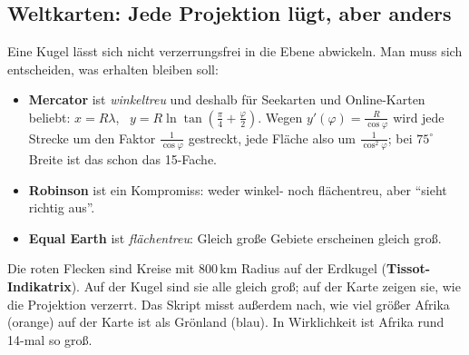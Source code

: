 \begin{ausgabe}

\centering
\begin{passend}%
%
\end{passend}
\end{ausgabe}



\subsection{Weltkarten: Jede Projektion lügt, aber anders}

Eine Kugel lässt sich nicht verzerrungsfrei in die Ebene abwickeln. Man muss sich entscheiden, was erhalten bleiben soll:

\begin{itemize}
	\item \textbf{Mercator} ist \textit{winkeltreu} und deshalb für Seekarten und Online-Karten beliebt: $x = R\lambda$, \ $y = R\ln\tan\left(\frac{\pi}{4}+\frac{\varphi}{2}\right)$. Wegen $y'(\varphi) = \frac{R}{\cos\varphi}$ wird jede Strecke um den Faktor $\frac{1}{\cos\varphi}$ gestreckt, jede Fläche also um $\frac{1}{\cos^2\varphi}$; bei $75^\circ$ Breite ist das schon das 15-Fache.
	\item \textbf{Robinson} ist ein Kompromiss: weder winkel- noch flächentreu, aber \enquote{sieht richtig aus}.
	\item \textbf{Equal Earth} ist \textit{flächentreu}: Gleich große Gebiete erscheinen gleich groß.
\end{itemize}

Die roten Flecken sind Kreise mit 800\,km Radius auf der Erdkugel (\textbf{Tissot-Indikatrix}). Auf der Kugel sind sie alle gleich groß; auf der Karte zeigen sie, wie die Projektion verzerrt. Das Skript misst außerdem nach, wie viel größer Afrika (orange) auf der Karte ist als Grönland (blau). In Wirklichkeit ist Afrika rund 14-mal so groß.


